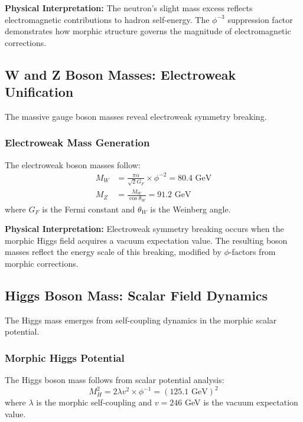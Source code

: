 \textbf{Physical Interpretation:}
The neutron's slight mass excess reflects electromagnetic contributions to hadron self-energy. The $\phi^{-3}$ suppression factor demonstrates how morphic structure governs the magnitude of electromagnetic corrections.

\subsection{W and Z Boson Masses: Electroweak Unification}

The massive gauge boson masses reveal electroweak symmetry breaking.

\subsubsection{Electroweak Mass Generation}

\begin{theorem}
The electroweak boson masses follow:
\begin{align}
M_W &= \frac{\pi \alpha}{\sqrt{2} G_F} \times \phi^{-2} = 80.4 \text{ GeV}\\
M_Z &= \frac{M_W}{\cos \theta_W} = 91.2 \text{ GeV}
\end{align}
where $G_F$ is the Fermi constant and $\theta_W$ is the Weinberg angle.
\end{theorem}

\textbf{Physical Interpretation:}
Electroweak symmetry breaking occurs when the morphic Higgs field acquires a vacuum expectation value. The resulting boson masses reflect the energy scale of this breaking, modified by $\phi$-factors from morphic corrections.

\subsection{Higgs Boson Mass: Scalar Field Dynamics}

The Higgs mass emerges from self-coupling dynamics in the morphic scalar potential.

\subsubsection{Morphic Higgs Potential}

\begin{theorem}
The Higgs boson mass follows from scalar potential analysis:
\begin{equation}
M_H^2 = 2\lambda v^2 \times \phi^{-1} = (125.1 \text{ GeV})^2
\end{equation}
where $\lambda$ is the morphic self-coupling and $v = 246$ GeV is the vacuum expectation value.
\end{theorem}

